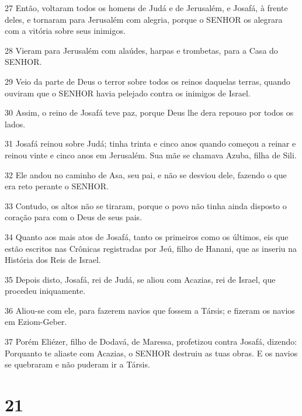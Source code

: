 \par 27 Então, voltaram todos os homens de Judá e de Jerusalém, e Josafá, à frente deles, e tornaram para Jerusalém com alegria, porque o SENHOR os alegrara com a vitória sobre seus inimigos.
\par 28 Vieram para Jerusalém com alaúdes, harpas e trombetas, para a Casa do SENHOR.
\par 29 Veio da parte de Deus o terror sobre todos os reinos daquelas terras, quando ouviram que o SENHOR havia pelejado contra os inimigos de Israel.
\par 30 Assim, o reino de Josafá teve paz, porque Deus lhe dera repouso por todos os lados.
\par 31 Josafá reinou sobre Judá; tinha trinta e cinco anos quando começou a reinar e reinou vinte e cinco anos em Jerusalém. Sua mãe se chamava Azuba, filha de Sili.
\par 32 Ele andou no caminho de Asa, seu pai, e não se desviou dele, fazendo o que era reto perante o SENHOR.
\par 33 Contudo, os altos não se tiraram, porque o povo não tinha ainda disposto o coração para com o Deus de seus pais.
\par 34 Quanto aos mais atos de Josafá, tanto os primeiros como os últimos, eis que estão escritos nas Crônicas registradas por Jeú, filho de Hanani, que as inseriu na História dos Reis de Israel.
\par 35 Depois disto, Josafá, rei de Judá, se aliou com Acazias, rei de Israel, que procedeu iniquamente.
\par 36 Aliou-se com ele, para fazerem navios que fossem a Társis; e fizeram os navios em Eziom-Geber.
\par 37 Porém Eliézer, filho de Dodavá, de Maressa, profetizou contra Josafá, dizendo: Porquanto te aliaste com Acazias, o SENHOR destruiu as tuas obras. E os navios se quebraram e não puderam ir a Társis.

\chapter{21}

